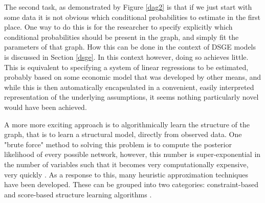 \documentclass{article}
\begin{document}
The second task, as demonstrated by Figure \ref{dag2} is that if we just start with some data it is not obvious which conditional probabilities to estimate in the first place. One way to do this is for the researcher to specify explicitly which conditional probabilities should be present in the graph, and simply fit the parameters of that graph. How this can be done in the context of DSGE models is discussed in Section \ref{dsge}. In this context however, doing so achieves little. This is equivalent to specifying a system of linear regressions to be estimated, probably based on some economic model that was developed by other means, and while this is then automatically encapsulated in a convenient, easily interpreted representation of the underlying assumptions, it seems nothing particularly novel would have been achieved. 

A more more exciting approach is to algorithmically learn the structure of the graph, that is to learn a structural model, directly from observed data. One "brute force" method to solving this problem is to compute the posterior likelihood of every possible network, however, this number is super-exponential in the number of variables such that it becomes very computationally expensive, very quickly \parencite{chickering1996learning}. As a response to this, many heuristic approximation techniques have been developed. These can be grouped into two categories: constraint-based and score-based structure learning algorithms \parencite{spirtes1991algorithm} \parencite{verma1991equivalence}. 
\end{document}

